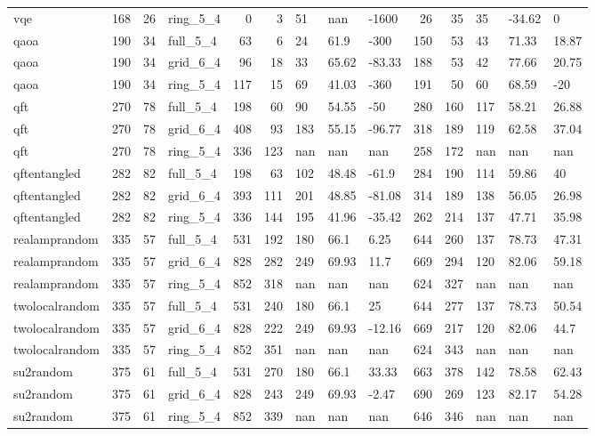 \begin{longtable}{lrrlrrlllrrlll}
vqe & 168 & 26 & ring\_5\_4 & 0 & 3 & 51 & nan & -1600 & 26 & 35 & 35 & -34.62 & 0 \\
qaoa & 190 & 34 & full\_5\_4 & 63 & 6 & 24 & 61.9 & -300 & 150 & 53 & 43 & 71.33 & 18.87 \\
qaoa & 190 & 34 & grid\_6\_4 & 96 & 18 & 33 & 65.62 & -83.33 & 188 & 53 & 42 & 77.66 & 20.75 \\
qaoa & 190 & 34 & ring\_5\_4 & 117 & 15 & 69 & 41.03 & -360 & 191 & 50 & 60 & 68.59 & -20 \\
qft & 270 & 78 & full\_5\_4 & 198 & 60 & 90 & 54.55 & -50 & 280 & 160 & 117 & 58.21 & 26.88 \\
qft & 270 & 78 & grid\_6\_4 & 408 & 93 & 183 & 55.15 & -96.77 & 318 & 189 & 119 & 62.58 & 37.04 \\
qft & 270 & 78 & ring\_5\_4 & 336 & 123 & nan & nan & nan & 258 & 172 & nan & nan & nan \\
qftentangled & 282 & 82 & full\_5\_4 & 198 & 63 & 102 & 48.48 & -61.9 & 284 & 190 & 114 & 59.86 & 40 \\
qftentangled & 282 & 82 & grid\_6\_4 & 393 & 111 & 201 & 48.85 & -81.08 & 314 & 189 & 138 & 56.05 & 26.98 \\
qftentangled & 282 & 82 & ring\_5\_4 & 336 & 144 & 195 & 41.96 & -35.42 & 262 & 214 & 137 & 47.71 & 35.98 \\
realamprandom & 335 & 57 & full\_5\_4 & 531 & 192 & 180 & 66.1 & 6.25 & 644 & 260 & 137 & 78.73 & 47.31 \\
realamprandom & 335 & 57 & grid\_6\_4 & 828 & 282 & 249 & 69.93 & 11.7 & 669 & 294 & 120 & 82.06 & 59.18 \\
realamprandom & 335 & 57 & ring\_5\_4 & 852 & 318 & nan & nan & nan & 624 & 327 & nan & nan & nan \\
twolocalrandom & 335 & 57 & full\_5\_4 & 531 & 240 & 180 & 66.1 & 25 & 644 & 277 & 137 & 78.73 & 50.54 \\
twolocalrandom & 335 & 57 & grid\_6\_4 & 828 & 222 & 249 & 69.93 & -12.16 & 669 & 217 & 120 & 82.06 & 44.7 \\
twolocalrandom & 335 & 57 & ring\_5\_4 & 852 & 351 & nan & nan & nan & 624 & 343 & nan & nan & nan \\
su2random & 375 & 61 & full\_5\_4 & 531 & 270 & 180 & 66.1 & 33.33 & 663 & 378 & 142 & 78.58 & 62.43 \\
su2random & 375 & 61 & grid\_6\_4 & 828 & 243 & 249 & 69.93 & -2.47 & 690 & 269 & 123 & 82.17 & 54.28 \\
su2random & 375 & 61 & ring\_5\_4 & 852 & 339 & nan & nan & nan & 646 & 346 & nan & nan & nan \\

\end{longtable}
